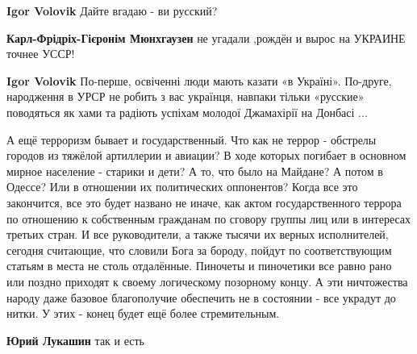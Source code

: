 \begin{itemize}
\begin{itemize}
\textbf{Igor Volovik} Дайте вгадаю - ви русский?

 
\textbf{Карл-Фрідріх-Гієронім Мюнхгаузен} не угадали ,рождён и вырос на УКРАИНЕ точнее УССР!

 
\textbf{Igor Volovik} По-перше, освіченні люди мають казати «в Україні». По-друге, народження в УРСР не робить з вас українця, навпаки тільки «русские» поводяться як хами та радіють успіхам молодої Джамахірії на Донбасі ...
\end{itemize}


А ещё терроризм бывает и государственный. Что как не террор - обстрелы городов
из тяжёлой артиллерии и авиации? В ходе которых погибает в основном мирное
население - старики и дети? А то, что было на Майдане? А потом в Одессе? Или в
отношении их политических оппонентов? Когда все это закончится, все это будет
названо не иначе, как актом государственного террора по отношению к собственным
гражданам по сговору группы лиц или в интересах третьих стран. И все
руководители, а также тысячи их верных исполнителей, сегодня считающие, что
словили Бога за бороду, пойдут по соответствующим статьям в места не столь
отдалённые. Пиночеты и пиночетики все равно рано или поздно приходят к своему
логическому позорному концу. А эти ничтожества народу даже базовое благополучие
обеспечить не в состоянии - все украдут до нитки. У этих - конец будет ещё
более стремительным.

\begin{itemize}
 
\textbf{Юрий Лукашин} так и есть


\end{itemize}
\end{itemize}
